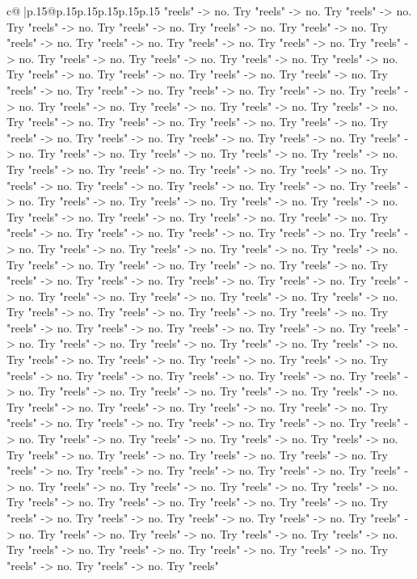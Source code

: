 \documentclass{article}
\begin{document}
{\begin{supertabular}{c@{$\;$}|p{.15\linewidth}@{}p{.15\linewidth}p{.15\linewidth}p{.15\linewidth}p{.15\linewidth}p{.15\linewidth}}
{{{"reels" {-}> no. Try "reels" {-}> no. Try "reels" {-}> no. Try "reels" {-}> no. Try "reels" {-}> no. Try "reels" {-}> no. Try "reels" {-}> no. Try "reels" {-}> no. Try "reels" {-}> no. Try "reels" {-}> no. Try "reels" {-}> no. Try "reels" {-}> no. Try "reels" {-}> no. Try "reels" {-}> no. Try "reels" {-}> no. Try "reels" {-}> no. Try "reels" {-}> no. Try "reels" {-}> no. Try "reels" {-}> no. Try "reels" {-}> no. Try "reels" {-}> no. Try "reels" {-}> no. Try "reels" {-}> no. Try "reels" {-}> no. Try "reels" {-}> no. Try "reels" {-}> no. Try "reels" {-}> no. Try "reels" {-}> no. Try "reels" {-}> no. Try "reels" {-}> no. Try "reels" {-}> no. Try "reels" {-}> no. Try "reels" {-}> no. Try "reels" {-}> no. Try "reels" {-}> no. Try "reels" {-}> no. Try "reels" {-}> no. Try "reels" {-}> no. Try "reels" {-}> no. Try "reels" {-}> no. Try "reels" {-}> no. Try "reels" {-}> no. Try "reels" {-}> no. Try "reels" {-}> no. Try "reels" {-}> no. Try "reels" {-}> no. Try "reels" {-}> no. Try "reels" {-}> no. Try "reels" {-}> no. Try "reels" {-}> no. Try "reels" {-}> no. Try "reels" {-}> no. Try "reels" {-}> no. Try "reels" {-}> no. Try "reels" {-}> no. Try "reels" {-}> no. Try "reels" {-}> no. Try "reels" {-}> no. Try "reels" {-}> no. Try "reels" {-}> no. Try "reels" {-}> no. Try "reels" {-}> no. Try "reels" {-}> no. Try "reels" {-}> no. Try "reels" {-}> no. Try "reels" {-}> no. Try "reels" {-}> no. Try "reels" {-}> no. Try "reels" {-}> no. Try "reels" {-}> no. Try "reels" {-}> no. Try "reels" {-}> no. Try "reels" {-}> no. Try "reels" {-}> no. Try "reels" {-}> no. Try "reels" {-}> no. Try "reels" {-}> no. Try "reels" {-}> no. Try "reels" {-}> no. Try "reels" {-}> no. Try "reels" {-}> no. Try "reels" {-}> no. Try "reels" {-}> no. Try "reels" {-}> no. Try "reels" {-}> no. Try "reels" {-}> no. Try "reels" {-}> no. Try "reels" {-}> no. Try "reels" {-}> no. Try "reels" {-}> no. Try "reels" {-}> no. Try "reels" {-}> no. Try "reels" {-}> no. Try "reels" {-}> no. Try "reels" {-}> no. Try "reels" {-}> no. Try "reels" {-}> no. Try "reels" {-}> no. Try "reels" {-}> no. Try "reels" {-}> no. Try "reels" {-}> no. Try "reels" {-}> no. Try "reels" {-}> no. Try "reels" {-}> no. Try "reels" {-}> no. Try "reels" {-}> no. Try "reels" {-}> no. Try "reels" {-}> no. Try "reels" {-}> no. Try "reels" {-}> no. Try "reels" {-}> no. Try "reels" {-}> no. Try "reels" {-}> no. Try "reels" {-}> no. Try "reels" {-}> no. Try "reels" {-}> no. Try "reels" {-}> no. Try "reels" {-}> no. Try "reels" {-}> no. Try "reels" {-}> no. Try "reels" {-}> no. Try "reels" {-}> no. Try "reels" {-}> no. Try "reels" {-}> no. Try "reels" {-}> no. Try "reels" {-}> no. Try "reels" {-}> no. Try "reels" {-}> no. Try "reels" {-}> no. Try "reels" {-}> no. Try "reels" {-}> no. Try "reels" {-}> no. Try "reels" {-}> no. Try "reels" {-}> no. Try "reels" {-}> no. Try "reels" {-}> no. Try "reels" {-}> no. Try "reels" {-}> no. Try "reels" {-}> no. Try "reels" {-}> no. Try "reels" {-}> no. Try "reels" {-}> no. Try "reels" {-}> no. Try "reels" {-}> no. Try "reels" {-}> no. Try "reels" {-}> no. Try "reels" {-}> no. Try "reels" {-}> no. Try "reels" {-}> no. Try "reels" {-}> no. Try "reels" {-}> no. Try "reels" {-}> no. Try "reels" }}}
\end{supertabular}}
\end{document}
